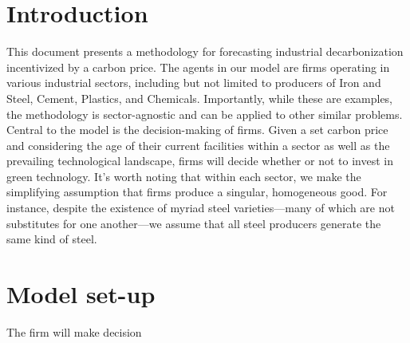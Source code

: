 \documentclass{article}
\begin{document}
\section*{Introduction}

This document presents a methodology for forecasting industrial decarbonization incentivized 
by a carbon price. The agents in our model are firms operating in various industrial sectors, 
including but not limited to producers of Iron and Steel, Cement, Plastics, and Chemicals. 
Importantly, while these are examples, the methodology is sector-agnostic and can be applied 
to other similar problems.
Central to the model is the decision-making of firms. Given a set carbon price and considering 
the age of their current facilities within a sector as well as the prevailing technological landscape, 
firms will decide whether or not to invest in green technology. It's worth noting that within each sector, 
we make the simplifying assumption that firms produce a singular, homogeneous good. For instance, 
despite the existence of myriad steel varieties—many of which are not substitutes for one another—we assume 
that all steel producers generate the same kind of steel.
\section{Model set-up}

The firm will make decision
\\
\\
\\
\\
\end{document}
